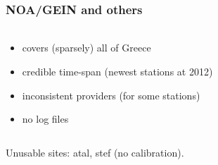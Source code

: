 \documentclass{beamer}
\begin{document}
\begin{frame}\frametitle{NOA/GEIN and others}\framesubtitle{}
\begin{columns}[T] %
\begin{column}{.40\textwidth}
  \begin{itemize}
    \item<pro@1-> covers (sparsely) all of Greece 
    \item<pro@1-> credible time-span (newest stations at 2012)
    \item<con@1-> inconsistent providers (for some stations)
    \item<con@1-> no log files
  \end{itemize}
\end{column}%
\hfill%
%
\end{columns}
  \begin{block}{}
    Unusable sites: atal, stef (no calibration).
  \end{block}
\end{frame}
\end{document}
